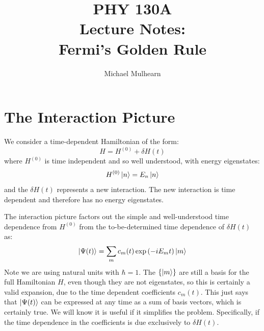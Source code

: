\documentclass[12pt]{article}
\begin{document}
\title{PHY 130A \\ Lecture Notes: \\
Fermi's Golden Rule }
\author{Michael Mulhearn}

\maketitle

\section{The Interaction Picture}

We consider a time-dependent Hamiltonian of the form:
$$H = H^{(0)} + \delta H(t)$$
where $H^{(0)}$ is time independent and so well understood, with energy eigenstates:
$$H^{(0)} \ket{n} = E_n \ket{n}$$
and the $\delta H(t)$ represents a new interaction.  The new
interaction is time dependent and therefore has no energy eigenstates.

The interaction picture factors out the simple and well-understood
time dependence from $H^{(0)}$ from the to-be-determined time
dependence of $\delta H(t)$ as:
$$\ket{ \Psi(t) } = \sum_m c_m(t) \exp\left( -i E_m t \right) \ket{m}$$
Note we are using natural units with $\hbar=1$.  The $\{\ket{m}\}$ are
still a basis for the full Hamiltonian $H$, even though they are not
eigenstates, so this is certainly a valid expansion, due to the time
dependent coefficients $c_m(t)$.  This just says that $\ket{\Psi(t)}$
can be expressed at any time as a sum of basis vectors, which is
certainly true.  We will know it is useful if it simplifies the
problem.  Specifically, if the time dependence in the coefficients is
due exclusively to $\delta H(t)$.
\end{document}
